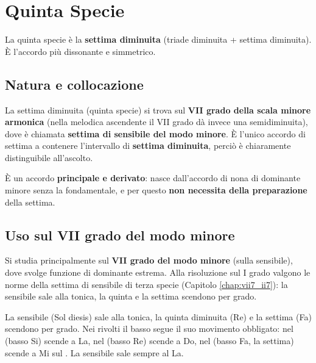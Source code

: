\section{Quinta Specie}
\label{sec:quinta_specie_dettaglio}

La quinta specie è la \textbf{settima diminuita} (triade diminuita + settima diminuita). È l'accordo più dissonante e simmetrico.

\subsection{Natura e collocazione}
\label{subsec:vii_dim7_natura}

\begin{regola}
	\label{reg:vii_dim7_gradi}
	La settima diminuita (quinta specie) si trova sul \textbf{VII grado della scala minore armonica} (nella melodica ascendente il VII grado dà invece una semidiminuita), dove è chiamata \textbf{settima di sensibile del modo minore}. È l'unico accordo di settima a contenere l'intervallo di \textbf{settima diminuita}, perciò è chiaramente distinguibile all'ascolto.
\end{regola}

È un accordo \textbf{principale e derivato}: nasce dall'accordo di nona di dominante minore senza la fondamentale, e per questo \textbf{non necessita della preparazione} della settima.

\subsection{Uso sul VII grado del modo minore}
Si studia principalmente sul \textbf{VII grado del modo minore} (sulla sensibile), dove svolge funzione di dominante estrema. Alla risoluzione sul I grado valgono le norme della settima di sensibile di terza specie (Capitolo \ref{chap:vii7_ii7}): la sensibile sale alla tonica, la quinta e la settima scendono per grado.

\begin{esempio}
	\label{ex:vii_dim7}
	La sensibile (Sol diesis) sale alla tonica, la quinta diminuita (Re) e la settima (Fa) scendono per grado.
	Nei rivolti il basso segue il suo movimento obbligato: nel  (basso Si) scende a La, nel  (basso Re) scende a Do, nel  (basso Fa, la settima) scende a Mi sul . La sensibile sale sempre al La.
\end{esempio}

